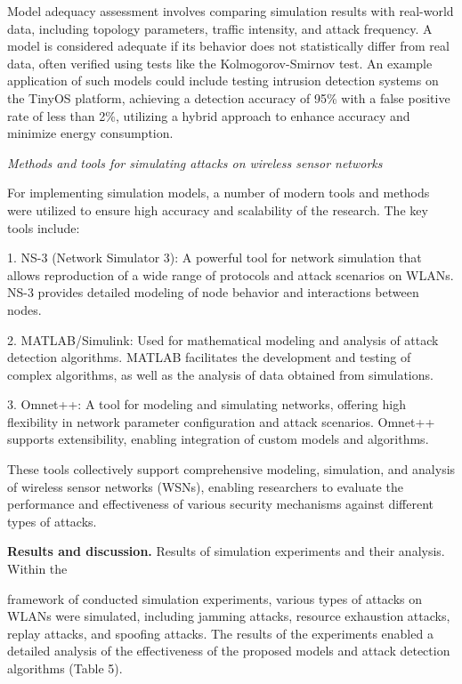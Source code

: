 \begin{multicols}{2}

Model adequacy assessment involves comparing simulation results with
real-world data, including topology parameters, traffic intensity, and
attack frequency. A model is considered adequate if its behavior does
not statistically differ from real data, often verified using tests like
the Kolmogorov-Smirnov test. An example application of such models could
include testing intrusion detection systems on the TinyOS platform,
achieving a detection accuracy of 95\% with a false positive rate of
less than 2\%, utilizing a hybrid approach to enhance accuracy and
minimize energy consumption.

\emph{Methods and tools for simulating attacks on wireless sensor
networks}

For implementing simulation models, a number of modern tools and methods
were utilized to ensure high accuracy and scalability of the research.
The key tools include:

1. NS-3 (Network Simulator 3): A powerful tool for network simulation
that allows reproduction of a wide range of protocols and attack
scenarios on WLANs. NS-3 provides detailed modeling of node behavior and
interactions between nodes.

2. MATLAB/Simulink: Used for mathematical modeling and analysis of
attack detection algorithms. MATLAB facilitates the development and
testing of complex algorithms, as well as the analysis of data obtained
from simulations.

3. Omnet++: A tool for modeling and simulating networks, offering high
flexibility in network parameter configuration and attack scenarios.
Omnet++ supports extensibility, enabling integration of custom models
and algorithms.

These tools collectively support comprehensive modeling, simulation, and
analysis of wireless sensor networks (WSNs), enabling researchers to
evaluate the performance and effectiveness of various security
mechanisms against different types of attacks.

{\bfseries Results and discussion.} Results of simulation experiments and
their analysis. Within the

framework of conducted simulation experiments, various types of attacks
on WLANs were simulated, including jamming attacks, resource exhaustion
attacks, replay attacks, and spoofing attacks. The results of the
experiments enabled a detailed analysis of the effectiveness of the
proposed models and attack detection algorithms (Table 5).
\end{multicols}


